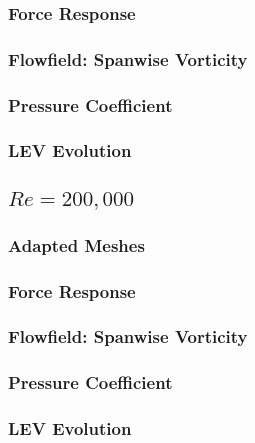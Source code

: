 \subsubsection{Force Response}

\label{sec:zonal_force_response}

\subsubsection{Flowfield: Spanwise Vorticity}

\label{sec:zonal_vorticity}

\subsubsection{Pressure Coefficient}

\label{sec:zonal_cp}

\subsubsection{LEV Evolution}

\label{sec:zonal_LEV}


\subsection{ $Re=200,000$}

\subsubsection{Adapted Meshes}

\label{sec:zonal_mesh_and_error_Re200k}


\subsubsection{Force Response}

\label{sec:zonal_force_response_Re200k}

\subsubsection{Flowfield: Spanwise Vorticity}

\label{sec:zonal_vorticity_Re200k}

\subsubsection{Pressure Coefficient}

\label{sec:zonal_cp_Re200k}

\subsubsection{LEV Evolution}

\label{sec:zonal_LEV_Re200k}




%

